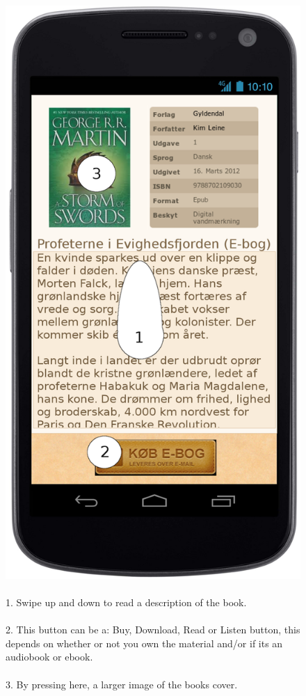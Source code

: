 \documentclass[12pt]{article}
\begin{document}
\begin{figure}
\includegraphics[scale=0.7]{gnexinfodownloadogkoeb.png}
\caption{
\\
1. Swipe up and down to read a description of the book.\\\\
2. This button can be a: Buy, Download, Read or Listen button, this depends on whether or not you own the material and/or if its an audiobook or ebook.\\\\
3. By pressing here, a larger image of the books cover.
}
\label{Book information}
\end{figure}
\end{document}

